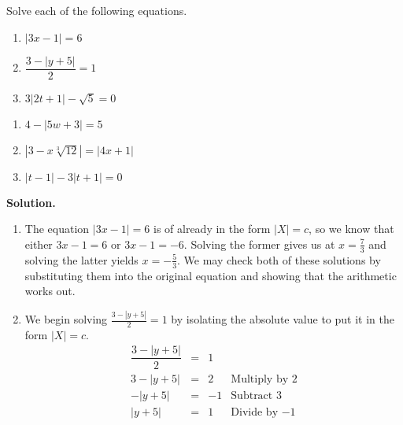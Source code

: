 \documentclass{ximera}
\begin{document}
\begin{ex} \label{absvalueeqnex}  Solve each of the following equations.

\vspace*{-.1in}

\begin{multicols}{3}
\begin{enumerate}

\item  $|3x-1| = 6$
\item  $\dfrac{3 - |y+5|}{2} = 1$
\item  $3|2t+1| - \sqrt{5} = 0$

\setcounter{HW}{\value{enumi}}
\end{enumerate}
\end{multicols}

\vspace*{-.3in}

\begin{multicols}{3}
\begin{enumerate}
\setcounter{enumi}{\value{HW}}

\item  $4 - |5w+3| = 5$

\item  $\left|3 - x \sqrt[3]{12}\right| = |4x+1|$

\item  $|t-1| - 3|t+1| = 0$

\end{enumerate}
\end{multicols}

\pagebreak

{\bf Solution.} 

\begin{enumerate}

\item  The equation  $|3x-1| = 6$ is of already in the form $|X| = c$, so we know that either $3x-1=6$ or $3x-1 = -6$.  Solving the former gives us at $x = \frac{7}{3}$ and solving the latter yields $x = -\frac{5}{3}$.  We may check both of these solutions by substituting them into the original equation and showing that the arithmetic works out.

\item  We begin solving  $\frac{3 - |y+5|}{2} = 1$ by isolating the absolute value to put it in the form $|X| = c$.\[ \begin{array}{rclr}
\dfrac{3 - |y+5|}{2} & = & 1 &  \\
3 - |y+5| & = & 2 & \text{Multiply by $2$}\\
-|y+5| & = & -1 & \text{Subtract $3$} \\
|y+5| & = & 1 & \text{Divide by $-1$}  \\ 


\end{array}\]
\end{enumerate}
\end{ex}
\end{document}
